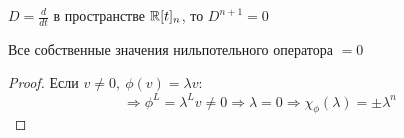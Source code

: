     \begin{example1}
        $D = \frac{d}{dt}$ в пространстве $\mathbb{R}[t]_n$, то $D^{n+1} = 0$   
    \end{example1}
    \begin{subtheorem}
        Все собственные значения нильпотельного оператора $= 0$
    \end{subtheorem} 
    \begin{proof}
        Если $v \neq 0, \ \phi(v) = \lambda v:$
        $$\Longrightarrow \phi^L = \lambda^Lv \neq 0 \Longrightarrow \lambda = 0 \Longrightarrow \chi_\phi(\lambda) = \pm \lambda^n$$
    \end{proof}  
    




    
